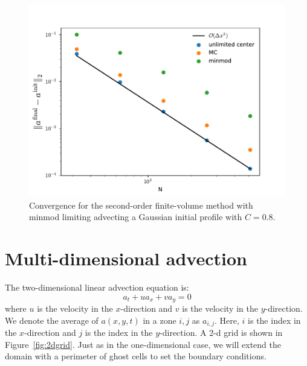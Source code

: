 \begin{figure}[t]
\centering
\includegraphics[width=0.8\linewidth]{plm-converge}
\caption[Convergence of second-order finite-volume advection]
        {\label{fig:advnorm} Convergence for the second-order
          finite-volume method with minmod limiting advecting a
          Gaussian initial profile with $C = 0.8$. \\
        }
\end{figure}

\section{Multi-dimensional advection}

The two-dimensional linear advection equation is:
\begin{equation}
a_t + u a_x + v a_y = 0
\label{eq:advect2d}
\end{equation}
where $u$ is the velocity in the $x$-direction and $v$ is the velocity in
the $y$-direction.  We denote the average of $a(x,y,t)$ in a zone $i,j$ as
$a_{i,j}$.  Here, $i$ is the index in the $x$-direction and $j$ is the
index in the $y$-direction.  A 2-d grid is shown in Figure~\ref{fig:2dgrid}.
Just as in the one-dimensional case, we will extend the domain with a
perimeter of ghost cells to set the boundary conditions.

